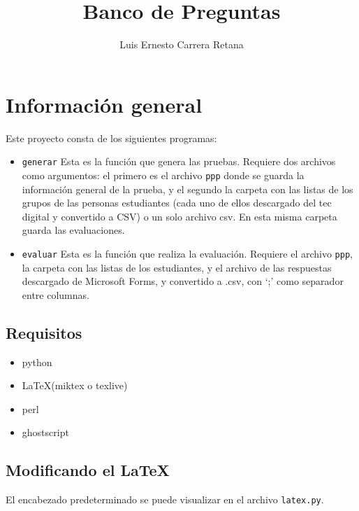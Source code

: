 \documentclass[12pt]{article}
\title{Banco de Preguntas}
\author{Luis Ernesto Carrera Retana}
\theoremstyle{definition}
\begin{document}
\maketitle

\section{Información general}

Este proyecto consta de los siguientes programas:
\begin{itemize}
  \item \verb|generar| Esta es la función que genera las pruebas. Requiere dos archivos como argumentos: el primero es el archivo \verb|ppp| donde se guarda la información general de la prueba, y el segundo la carpeta con las listas de los grupos de las personas estudiantes (cada uno de ellos descargado del tec digital y convertido a CSV) o un solo archivo csv. En esta misma carpeta guarda las evaluaciones.

  \item \verb|evaluar| Esta es la función que realiza la evaluación. Requiere el archivo \verb|ppp|, la carpeta con las listas de los estudiantes, y el archivo de las respuestas descargado de Microsoft Forms, y convertido a .csv, con `;' como separador entre columnas.
\end{itemize}

\subsection{Requisitos}
\begin{itemize}
  \item python
  \item \LaTeX (miktex o texlive)
  \item perl
  \item ghostscript
\end{itemize}

\subsection{Modificando el \LaTeX}
El encabezado predeterminado se puede visualizar en el archivo \verb|latex.py|.
\end{document}
